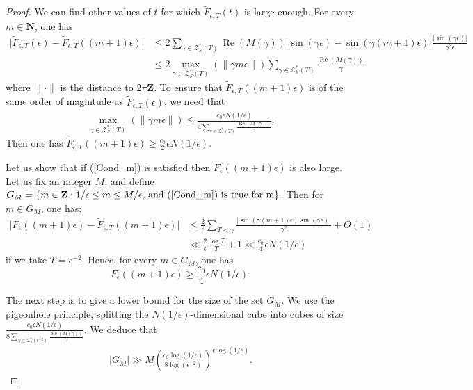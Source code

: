 \documentclass[a4paper,10pt]{amsart}
\theoremstyle{plain}
\theoremstyle{definition}
\begin{document}
\begin{proof}
We can find other values of $t$ for which $\tilde{F}_{\epsilon,T}(t)$ is large enough.
For every $m\in \mathbf{N}$, one has
\begin{align*}
\lvert \tilde{F}_{\epsilon,T}(\epsilon) - \tilde{F}_{\epsilon,T}((m+1)\epsilon) \rvert
 &\leq 2\sum_{\gamma\in\mathcal{Z}^{*}_{\mathcal{S}}(T)}\operatorname{Re}(M(\gamma))
 \lvert \sin(\gamma\epsilon) - \sin(\gamma(m+1)\epsilon)\rvert
\frac{\lvert\sin(\gamma\epsilon)\rvert}{\gamma^{2}\epsilon} \\
  &\leq 2\max_{\gamma\in\mathcal{Z}^{*}_{\mathcal{S}}(T)}\left(\lVert \gamma m\epsilon\rVert\right)
 \sum_{\gamma\in\mathcal{Z}^{*}_{\mathcal{S}}(T)}\frac{\operatorname{Re}(M(\gamma))}{\gamma}
\end{align*} 
where $\lVert \cdot \rVert$ is the distance to $2\pi\mathbf{Z}$.
To ensure that $\tilde{F}_{\epsilon,T}((m+1)\epsilon)$ is of the same order of magintude as $\tilde{F}_{\epsilon,T}(\epsilon)$, we need that
\begin{align}\label{Cond_m}
\max_{\gamma\in\mathcal{Z}^{*}_{\mathcal{S}}(T)}\left(\lVert \gamma m\epsilon\rVert\right) \leq 
\frac{c_{0} \epsilon N(1/\epsilon)}{4\sum_{\gamma\in\mathcal{Z}^{*}_{\mathcal{S}}(T)}\frac{\operatorname{Re}(M(\gamma))}{\gamma}}.
\end{align}
Then one has  $\tilde{F}_{\epsilon,T}((m+1)\epsilon)\geq \frac{c_{0}}{2} \epsilon N(1/\epsilon)$.

Let us show that if (\ref{Cond_m}) is satisfied then $F_{\epsilon}((m+1)\epsilon)$ is also large.
Let us fix an integer $M$, and define 
$G_{M} = \lbrace m\in \mathbf{Z} : 1/\epsilon\leq m\leq M/\epsilon \text{, and (\ref{Cond_m}) is true for m}\rbrace$.
Then for $m\in G_{M}$, one has:
\begin{align*}
\lvert F_{\epsilon}((m+1)\epsilon) - \tilde{F}_{\epsilon,T}((m+1)\epsilon) \rvert
&\leq \frac{2}{\epsilon}\sum_{ T<\gamma} \frac{\lvert\sin(\gamma (m+1)\epsilon)\sin(\gamma\epsilon)\rvert}{\gamma^{2}} + O(1)\\
&\ll \frac{2}{\epsilon}\frac{\log T}{T} + 1 \ll \frac{c_{0}}{4}\epsilon N(1/\epsilon)
\end{align*}
if we take $T=\epsilon^{-2}$.
Hence, for every $m\in G_{M}$, one has
$$F_{\epsilon}((m+1)\epsilon) \geq \frac{c_{0}}{4}\epsilon N(1/\epsilon).$$

The next step is to give a lower bound for the size of the set $G_{M}$.
We use the pigeonhole principle, splitting the $N(1/\epsilon)$-dimensional cube into cubes of size $\frac{c_{0}\epsilon N(1/\epsilon)}{8\sum_{\gamma\in\mathcal{Z}^{*}_{\mathcal{S}}(\epsilon^{-2})}\frac{\operatorname{Re}(M(\gamma))}{\gamma}}$.
We deduce that
\begin{align}\label{Form_Min_taille_GM}
\lvert G_{M}\rvert \gg M \left(\frac{c_{0}\log(1/\epsilon)}{8 \log(\epsilon^{-2})}\right)^{\epsilon\log(1/\epsilon)}.
\end{align}


\end{proof}
\end{document}
